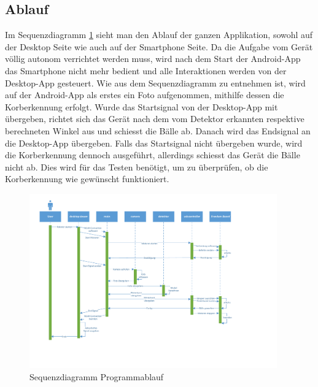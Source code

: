 \subsection{Ablauf}

Im Sequenzdiagramm \ref{abb:SequenzdiagrammSoftware} sieht man den Ablauf der ganzen Applikation, sowohl auf der Desktop 
Seite wie auch auf der Smartphone Seite. Da die Aufgabe vom Gerät völlig autonom verrichtet 
werden muss, wird nach dem Start der Android-App das Smartphone nicht mehr bedient 
und alle Interaktionen werden von der Desktop-App gesteuert. 
Wie aus dem Sequenzdiagramm zu entnehmen ist, wird auf der Android-App als erstes ein 
Foto aufgenommen, mithilfe dessen die Korberkennung erfolgt. 
Wurde das Startsignal von der Desktop-App mit übergeben, richtet sich das Gerät nach dem vom Detektor erkannten 
respektive berechneten Winkel aus und schiesst die Bälle ab. 
Danach wird das Endsignal an die Desktop-App übergeben.
Falls das Startsignal nicht übergeben wurde, wird die Korberkennung dennoch ausgeführt, 
allerdings schiesst das Gerät die Bälle nicht ab. Dies wird für das Testen benötigt, um 
zu überprüfen, ob die Korberkennung wie gewünscht funktioniert.


\begin{figure}[h!]
	\includegraphics[width=0.95\textwidth,clip,trim=12mm 35mm 55mm 5mm]
	{Enddokumentation/Bilder/Sequenzdiagramm_PREN2_v1.pdf}
	\centering
	\caption{Sequenzdiagramm Programmablauf}
	\label{abb:SequenzdiagrammSoftware}
\end{figure}


            
